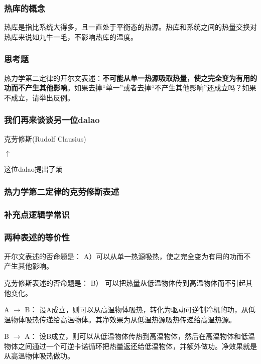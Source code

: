 \documentclass[CJK, 14pt]{beamer}
\begin{document}
\begin{frame}
\frametitle{热库的概念}

热库是指比系统大得多，且一直处于平衡态的热源。热库和系统之间的热量交换对热库来说如九牛一毛，不影响热库的温度。


\end{frame}




\begin{frame}
  \frametitle{思考题}

  
  热力学第二定律的开尔文表述：{\bf 不可能从单一热源吸取热量，使之完全变为有用的功而不产生其他影响}。如果去掉“单一”或者去掉“不产生其他影响”还成立吗？如果不成立，请举出反例。
             
  
\end{frame}


\begin{frame}
\frametitle{我们再来谈谈另一位dalao}

\bcenter
克劳修斯(Rudolf Clausius)
\ecenter


\bcenter
$\uparrow$

这位dalao提出了熵
\ecenter

\end{frame}

\begin{frame}
\frametitle{热力学第二定律的克劳修斯表述}

\end{frame}

\begin{frame}
\frametitle{补充点逻辑学常识}


\end{frame}

\begin{frame}
\frametitle{两种表述的等价性}
{\small
\bitem
\item{
开尔文表述的否命题是： A）可以从单一热源吸热，使之完全变为有用的功而不产生其他影响。
}
\item{
克劳修斯表述的否命题是： B） 可以把热量从低温物体传到高温物体而不引起其他变化。
}
\eitem
\bitem
\item{A $\rightarrow$ B： 设A成立，则可以从高温物体吸热，转化为驱动可逆制冷机的功，从低温物体吸热传递给高温物体。其净效果为从低温热源吸热传递给高温热源。}
\item{B $\rightarrow$ A： 设B成立，则可以从低温物体传热到高温物体，然后在高温物体和低温物体之间通过一个可逆卡诺循环把热量返还给低温物体，并额外做功。净效果就是从高温物体吸热做功。}
  \eitem
}

\end{frame}
\end{document}
